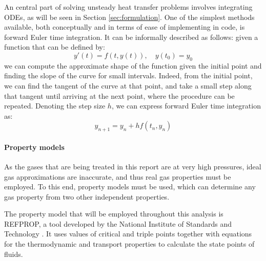 An central part of solving unsteady heat transfer problems involves integrating ODEs, as will be seen in Section \ref{sec:formulation}. One of the simplest methods available, both conceptually and in terms of ease of implementing in code, is forward Euler time integration. It can be informally described as follows: given a function that can be defined by: 
\begin{equation}
y'(t) = f(t,y(t)), \quad y(t_0) = y_0
\end{equation}
we can compute the approximate shape of the function given the initial point and finding the slope of the curve for small intervals. Indeed, from the initial point, we can find the tangent of the curve at that point, and take a small step along that tangent until arriving at the next point, where the procedure can be repeated. Denoting the step size $h$, we can express forward Euler time integration as:
\begin{equation}
y_{n+1} =  y_n + hf(t_n,y_n)
\end{equation}

\paragraph{Property models}
\label{sec:property_models}
As the gases that are being treated in this report are at very high pressures, ideal gas approximations are inaccurate, and thus real gas properties must be employed. To this end, property models must be used, which can determine any gas property from two other independent properties.

The property model that will be employed throughout this analysis is REFPROP, a tool developed by the National Institute of Standards and Technology \cite{refprop}. It uses values of critical and triple points together with equations for the thermodynamic and transport properties to calculate the state points of fluids.




